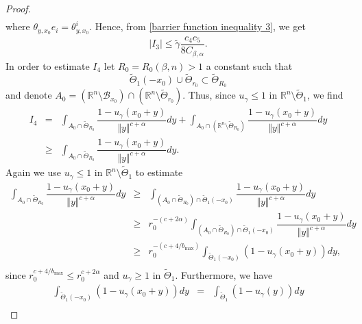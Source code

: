 \documentclass[10pt, leqno]{article}
\theoremstyle{definition}
\theoremstyle{remark}
\numberwithin{equation}{section}
\begin{document}
\begin{proof}
\begin{eqnarray}
\end{eqnarray}
where $\theta_{y,x_{0}}e_{i}=\theta^{i}_{y,x_{0}}$. Hence, from \eqref{barrier function inequality 3}, we get
\begin{eqnarray}
\label{barrier function inequality 5}
\left | I_{3} \right | \leq \tilde{\gamma} \dfrac{c_{4}c_{5}}{8C_{\beta, \alpha}}.
\end{eqnarray}
In order to estimate $I_{4}$ let $R_{0}=R_{0}(\beta, n) > 1$ a constant such that
$$
\tilde{\Theta}_{1}(-x_{0}) \cup \tilde{\Theta}_{r_{0}}\subset \tilde{\Theta}_{R_{0}}
$$
and denote $A_{0} = \left(\mathbb{R}^{n} \setminus \mathcal{B}_{x_{0}}\right) \cap \left(\mathbb{R}^{n} \setminus \tilde{\Theta}_{r_{0}} \right)$. Thus, since $u_{\gamma}\leq 1$ in $\mathbb{R}^{n} \setminus \tilde{\Theta}_{1}$, we find
\begin{eqnarray}
\label{barrier function inequality 6}
 I_{4} & = & \int_{A_{0} \cap \tilde{\Theta}_{R_{0}}} \dfrac{1 - u_{\gamma}(x_{0} + y)}{\Vert y \Vert^{c+\alpha}} dy + \int_{A_{0} \cap (\mathbb{R}^{n} \setminus \tilde{\Theta}_{R_{0}}) } \dfrac{1 - u_{\gamma}(x_{0} + y)}{\Vert y \Vert^{c+\alpha}} dy \\ \nonumber
& \geq  & \int_{A_{0} \cap \tilde{\Theta}_{R_{0}}} \dfrac{1 - u_{\gamma}(x_{0} + y)}{\Vert y \Vert^{c+\alpha}} dy.
\end{eqnarray}
Again we use $u_{\gamma}\leq 1$ in $\mathbb{R}^{n} \setminus \tilde{\Theta}_{1}$ to estimate
\begin{eqnarray}
\int_{A_{0} \cap \tilde{\Theta}_{R_{0}}} \dfrac{1 - u_{\gamma}(x_{0} + y)}{\Vert y \Vert^{c+\alpha}} dy &\geq & \int_{\left(A_{0} \cap \tilde{\Theta}_{R_{0}} \right) \cap \tilde{\Theta}_{1}(-x_{0})} \dfrac{1 - u_{\gamma}(x_{0} + y)}{\Vert y \Vert^{c+\alpha}} dy \\ \nonumber
& \geq & r_{0}^{-(c+2\alpha)}\int_{\left(A_{0} \cap \tilde{\Theta}_{R_{0}} \right) \cap \tilde{\Theta}_{1}(-x_{0})} \dfrac{1 - u_{\gamma}(x_{0} + y)}{\Vert y \Vert^{c+\alpha}} dy \\ \nonumber
& \geq & r_{0}^{-(c+4/b_{\max})}\int_{ \tilde{\Theta}_{1}(-x_{0})} \left(1 - u_{\gamma}(x_{0} + y)\right)dy, \\ \nonumber
\end{eqnarray}
since $r^{c+4/b_{\max}}_{0} \leq r_{0}^{c+2\alpha}$ and $u_{\gamma}\geq 1$ in $\tilde{\Theta}_{1}$.
Furthermore, we have
\begin{eqnarray}
\int_{ \tilde{\Theta}_{1}(-x_{0})} \left(1 - u_{\gamma}(x_{0} + y)\right)dy & = & \int_{ \tilde{\Theta}_{1}} \left(1 - u_{\gamma}(y)\right)dy \\ \nonumber

\end{eqnarray}
\end{proof}
\end{document}
